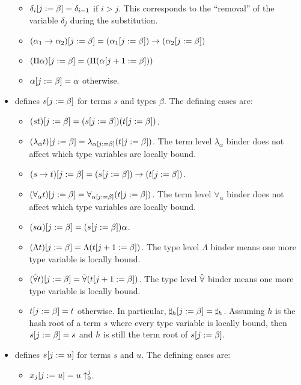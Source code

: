 \begin{itemize}
\begin{itemize}
\item $\dbsub{j}{\beta}{\delta_i} = \delta_{i-1}$ if $i>j$. This corresponds to the ``removal'' of the variable $\delta_j$ during the substitution.
\item $\dbsub{j}{\beta}{(\alpha_1\to\alpha_2)} = (\dbsub{j}{\beta}{\alpha_1})\to (\dbsub{j}{\beta}{\alpha_2})$
\item $\dbsub{j}{\beta}{(\Pi \alpha)} = (\Pi (\dbsub{j+1}{\beta}{\alpha}))$
\item $\dbsub{j}{\beta}{\alpha} = \alpha$ otherwise.
\end{itemize}
\item {} defines $\dbsub{j}{\beta}{s}$ for terms $s$ and types $\beta$.
The defining cases are:
\begin{itemize}
\item $\dbsub{j}{\beta}{(st)} = (\dbsub{j}{\beta}{s}) (\dbsub{j}{\beta}{t})$.
\item $\dbsub{j}{\beta}{(\lambda_\alpha t)} = \lambda_{\dbsub{j}{\beta}{\alpha}} (\dbsub{j}{\beta}{t})$. The term level $\lambda_\alpha$ binder does not affect which type variables are locally bound.
\item $\dbsub{j}{\beta}{(s\to t)} = (\dbsub{j}{\beta}{s}) \to (\dbsub{j}{\beta}{t})$.
\item $\dbsub{j}{\beta}{(\forall_\alpha t)} = \forall_{\dbsub{j}{\beta}\alpha} (\dbsub{j}{\beta}{t})$. The term level $\forall_\alpha$ binder does not affect which type variables are locally bound.
\item $\dbsub{j}{\beta}{(s\alpha)} = (\dbsub{j}{\beta}{s}) \alpha$.
\item $\dbsub{j}{\beta}{(\Lambda t)} = \Lambda (\dbsub{j+1}{\beta}{t})$. The type level $\Lambda$ binder means one more type variable is locally bound.
\item $\dbsub{j}{\beta}{(\tforall t)} = \tforall (\dbsub{j+1}{\beta}{t})$. The type level $\tforall$ binder means one more type variable is locally bound.
\item $\dbsub{j}{\beta}{t} = t$ otherwise. In particular, $\dbsub{j}{\beta}{\tmh{h}} = \tmh{h}$.
Assuming $h$ is the hash root of a term $s$ where every type variable is locally bound,
then $\dbsub{j}{\beta}{s} = s$
and $h$ is still the term root of $\dbsub{j}{\beta}{s}$.
\end{itemize}
\item {} defines $\dbsub{j}{u}{s}$ for terms $s$ and $u$.
The defining cases are:
\begin{itemize}
\item $\dbsub{j}{u}{x_j} = \dbsh{0}{j}{u}$.

\end{itemize}
\end{itemize}
